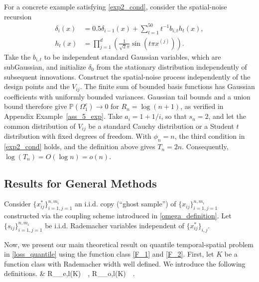\documentclass[twoside,11pt]{article}
\newenvironment{revision}{\color{revisionred}}{}
\begin{document}
\begin{example}
\begin{revision}
For a concrete example satisfying \eqref{exp2_cond}, consider the spatial-noise recursion
\begin{align*}
\delta_i(x)&=0.5\delta_{i-1}(x)+\sum_{t=1}^{50}t^{-1}b_{i,t}h_t(x),\\
h_t(x)&=\prod_{j=1}^d\left(\frac{1}{\sqrt{2}\pi}\sin(t\pi x^{(j)})\right).
\end{align*}
Take the $b_{i,t}$ to be independent standard Gaussian variables, which are subGaussian, and initialize $\delta_0$ from the stationary distribution independently of subsequent innovations. Construct the spatial-noise process independently of the design points and the $V_{ij}$. The finite sum of bounded basis functions has Gaussian coefficients with uniformly bounded variances. Gaussian tail bounds and a union bound therefore give $\mathbb{P}(\Omega_1^c)\to0$ for $R_n=\log(n+1)$, as verified in Appendix Example~\ref{ass_5_exp}.
Take $a_i=1+1/i$, so that $s_n=2$, and let the common distribution of $V_{ij}$ be a standard Cauchy distribution or a Student $t$ distribution with fixed degrees of freedom. With $\phi_n=n$, the third condition in \eqref{exp2_cond} holds, and the definition above gives $T_n=2n$. Consequently, $\log(T_n)=O(\log n)=o(n)$.
\end{revision}
\end{example}

\subsection{Results for General Methods}
Consider $\{x_{ij}^*\}_{i=1,j=1}^{n,m_i}$ an i.i.d. copy (``ghost sample'') of 
$\{x_{ij}\}_{i=1,j=1}^{n,m_i}$ constructed via the coupling scheme introduced in \eqref{omega_definition}.
Let $\{s_{ij}\}_{i=1,j=1}^{n,m_i}$ be i.i.d. Rademacher variables independent of 
$\{x_{ij}^*\}_{i,j}$.


Now, we present our main theoretical result on quantile temporal-spatial problem in \eqref{loss_quantile} 
using the function class \eqref{F_1} and \eqref{F_2}. First, let $K$ be a function class with Rademacher width well defined. We introduce the following definitions. 
\beq 
\label{rademacher_def_blocks}
& R_{_{e,l}}(K) \,\coloneqq\,  , \quad
R_{_{o,l}}(K) \,\coloneqq\, . 
\beq 
\end{document}
